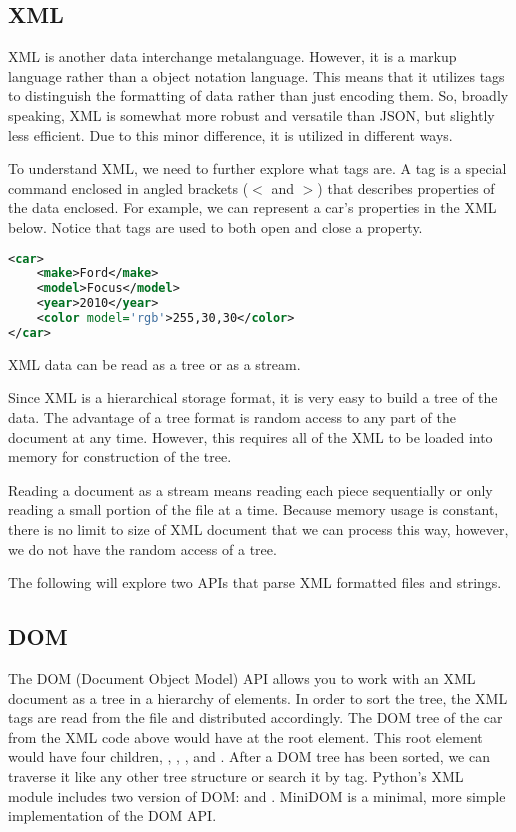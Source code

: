 \subsection*{XML}
XML is another data interchange metalanguage.
However, it is a markup language rather than a object notation language. This means that it utilizes tags to distinguish the formatting of data rather than just encoding them.
So, broadly speaking, XML is somewhat more robust and versatile than JSON, but slightly less efficient. 
Due to this minor difference, it is utilized in different ways.

To understand XML, we need to further explore what tags are.
A tag is a special command enclosed in angled brackets ($<$ and $>$) that describes properties of the data enclosed.
For example, we can represent a car's properties in the XML below. Notice that tags are used to both open and close a property.
\begin{lstlisting}[language=XML]
<car>
    <make>Ford</make>
    <model>Focus</model>
    <year>2010</year>
    <color model='rgb'>255,30,30</color>
</car>
\end{lstlisting}
XML data can be read as a tree or as a stream.

Since XML is a hierarchical storage format, it is very easy to build a tree of the data.
The advantage of a tree format is random access to any part of the document at any time.
However, this requires all of the XML to be loaded into memory for construction of the tree.

Reading a document as a stream means reading each piece sequentially or only reading a small portion of the file at a time.
Because memory usage is constant, there is no limit to size of XML document that we can process this way, however, we do not have the random access of a tree.

The following will explore two APIs that parse XML formatted files and strings.

\subsection*{DOM}
The DOM (Document Object Model) API allows you to work with an XML document as a tree in a hierarchy of elements.
In order to sort the tree, the XML tags are read from the file and distributed accordingly.
The DOM tree of the car from the XML code above would have  at the root element.
This root element would have four children, , , , and .
After a DOM tree has been sorted, we can traverse it like any other tree structure or search it by tag.
Python's XML module includes two version of DOM:  and .
MiniDOM is a minimal, more simple implementation of the DOM API.

